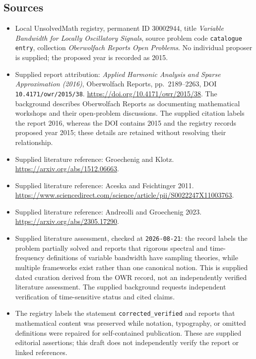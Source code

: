 \documentclass[11pt]{article}
\begin{document}
\subsection{Sources}
\begin{itemize}
\item Local UnsolvedMath registry, permanent ID \(30002944\), title \emph{Variable Bandwidth for Locally Oscillatory Signals}, source problem code \texttt{catalogue entry}, collection \emph{Oberwolfach Reports Open Problems}. No individual proposer is supplied; the proposed year is recorded as 2015.
\item Supplied report attribution: \emph{Applied Harmonic Analysis and Sparse Approximation (2016)}, Oberwolfach Reports, pp.\ 2189--2263, DOI \texttt{10.4171/owr/2015/38}. \url{https://doi.org/10.4171/owr/2015/38}. The background describes Oberwolfach Reports as documenting mathematical workshops and their open-problem discussions. The supplied citation labels the report 2016, whereas the DOI contains 2015 and the registry records proposed year 2015; these details are retained without resolving their relationship.
\item Supplied literature reference: Groechenig and Klotz. \url{https://arxiv.org/abs/1512.06663}.
\item Supplied literature reference: Aceska and Feichtinger 2011. \url{https://www.sciencedirect.com/science/article/pii/S0022247X11003763}.
\item Supplied literature reference: Andreolli and Groechenig 2023. \url{https://arxiv.org/abs/2305.17290}.
\item Supplied literature assessment, checked at \texttt{2026-08-21}: the record labels the problem partially solved and reports that rigorous spectral and time-frequency definitions of variable bandwidth have sampling theories, while multiple frameworks exist rather than one canonical notion. This is supplied dated curation derived from the OWR record, not an independently verified literature assessment. The supplied background requests independent verification of time-sensitive status and cited claims.
\item The registry labels the statement \texttt{corrected\_verified} and reports that mathematical content was preserved while notation, typography, or omitted definitions were repaired for self-contained publication. These are supplied editorial assertions; this draft does not independently verify the report or linked references.
\end{itemize}
\end{document}
